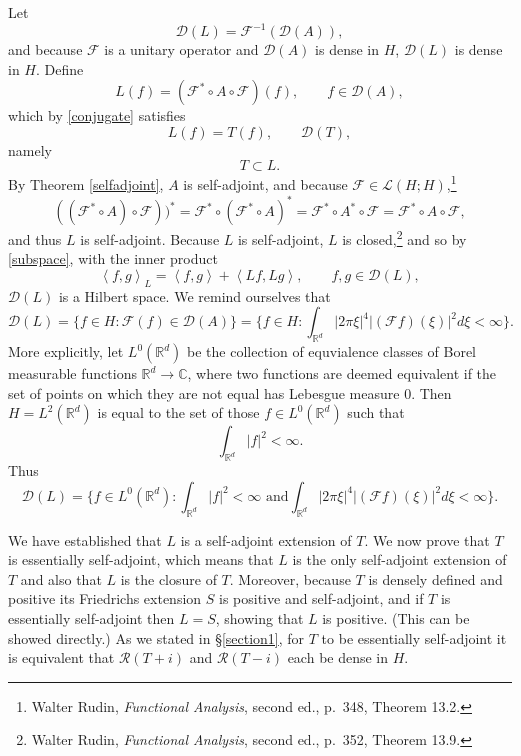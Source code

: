 \documentclass{article}
\newcommand{\inner}[2]{\left\langle #1, #2 \right\rangle}
\theoremstyle{definition}
\begin{document}
Let 
\[
\mathscr{D}(L) = \mathscr{F}^{-1}(\mathscr{D}(A)),
\]
and because $\mathscr{F}$ is a unitary operator and $\mathscr{D}(A)$ is dense in $H$,
$\mathscr{D}(L)$ is dense in $H$. Define
\[
L(f) =  (\mathscr{F}^* \circ A \circ \mathscr{F})(f),\qquad f \in \mathscr{D}(A),
\]
which by \eqref{conjugate} satisfies
\[
L(f) = T(f), \qquad \mathscr{D}(T),
\]
namely
\[
T \subset L.
\]
By Theorem \ref{selfadjoint}, $A$ is self-adjoint, and because $\mathscr{F} \in \mathscr{L}(H;H)$,\footnote{Walter Rudin, {\em Functional Analysis},
second ed., p.~348, Theorem 13.2.}
\[
((\mathscr{F}^* \circ A) \circ \mathscr{F}))^*
=\mathscr{F}^* \circ (\mathscr{F}^* \circ A)^*
=\mathscr{F}^* \circ A^* \circ \mathscr{F}
=\mathscr{F}^* \circ A \circ \mathscr{F},
\]
and thus $L$ is self-adjoint. Because $L$ is self-adjoint, $L$ is closed,\footnote{Walter
Rudin, {\em Functional Analysis}, second ed., p.~352, Theorem 13.9.}
and so by \eqref{subspace}, with the inner product
\[
\inner{f}{g}_L = \inner{f}{g}+\inner{Lf}{Lg},\qquad f,g \in \mathscr{D}(L),
\]
$\mathscr{D}(L)$ is a Hilbert space. We remind ourselves that
\[
\mathscr{D}(L) = \{f \in H: \mathscr{F}(f) \in \mathscr{D}(A)\}
=\{f \in H: \int_{\mathbb{R}^d} |2\pi \xi|^4 |(\mathscr{F}f)(\xi)|^2 d\xi<\infty\}.
\]
More explicitly, let $L^0(\mathbb{R}^d)$ be the collection of equvialence classes of Borel measurable functions
$\mathbb{R}^d \to \mathbb{C}$, where two functions are deemed equivalent if the set of points on which they are not equal
has Lebesgue measure $0$. Then $H=L^2(\mathbb{R}^d)$ is equal to the set of those $f \in L^0(\mathbb{R}^d)$ such
that 
\[
\int_{\mathbb{R}^d} |f|^2 < \infty.
\]
Thus
\[
\mathscr{D}(L) = \{f \in L^0(\mathbb{R}^d): \textrm{$\int_{\mathbb{R}^d} |f|^2 < \infty$ and
$\int_{\mathbb{R}^d}  |2\pi \xi|^4 |(\mathscr{F}f)(\xi)|^2 d\xi<\infty$}\}.
\]


We have established that $L$ is a self-adjoint extension of $T$. We now prove that $T$ is essentially self-adjoint, which means
that $L$ is the only self-adjoint extension of $T$ and also that $L$ is the closure of $T$. Moreover, 
because $T$ is densely defined and positive its Friedrichs extension $S$ is positive and self-adjoint,
and if $T$ is essentially self-adjoint then $L=S$, showing that $L$ is positive. (This can be showed directly.)
  As we stated in \S \ref{section1}, for $T$ to be essentially self-adjoint
it is equivalent that $\mathscr{R}(T+i)$ and $\mathscr{R}(T-i)$ each be dense in $H$. 
\end{document}
